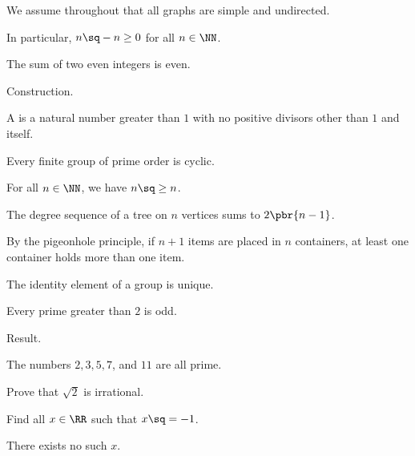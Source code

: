 \begin{assumption}
    We assume throughout that all graphs are simple and undirected.
\end{assumption}
\begin{corollary}
    In particular, $n\sq - n \geq 0$ for all $n \in \NN$.
\end{corollary}
\begin{claim}
    The sum of two even integers is even.
\end{claim}
\begin{construction}
    Construction.
\end{construction}
\begin{definition}
    A  is a natural number greater than $1$ with no positive divisors other than $1$ and itself.
\end{definition}
\begin{fact}
    Every finite group of prime order is cyclic.
\end{fact}
\begin{lemma}
    For all $n \in \NN$, we have $n\sq \geq n$.
\end{lemma}
\begin{observation}
    The degree sequence of a tree on $n$ vertices sums to $2\pbr{n - 1}$.
\end{observation}
\begin{principle}
    By the pigeonhole principle, if $n + 1$ items are placed in $n$ containers, at least one container holds more than one item.
\end{principle}
\begin{property}
    The identity element of a group is unique.
\end{property}
\begin{proposition}
    Every prime greater than $2$ is odd.
\end{proposition}
\begin{result}
    Result.
\end{result}
\begin{example}
    The numbers $2, 3, 5, 7$, and $11$ are all prime.
\end{example}
\begin{exercise}
    Prove that $\sqrt{2}$ is irrational.
\end{exercise}
\begin{problem}
    Find all $x \in \RR$ such that $x\sq = -1$.
\end{problem}
\begin{solution}
    There exists no such $x$.
\end{solution}
